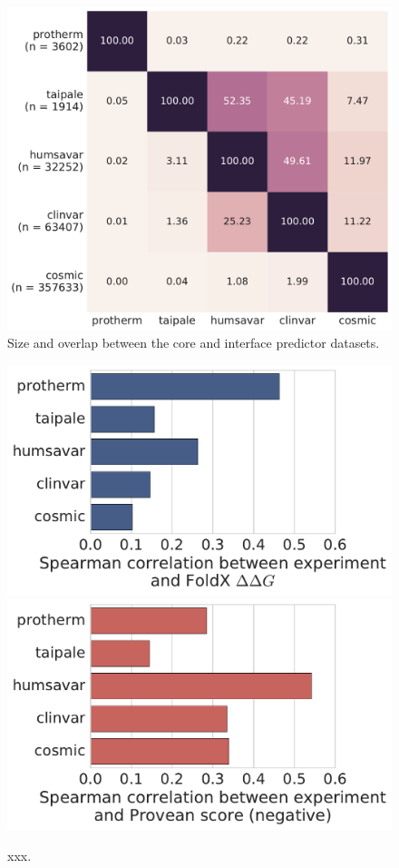 
\begin{figure}[h]
	\centering
	\includegraphics[width=1\textwidth]{figures/elaspic_training_set/core_data_statistics/training_set_overlap_final}
	\caption{Size and overlap between the core and interface predictor datasets.}
\end{figure}


\begin{figure}[h]
	\centering
	\includegraphics[width=1\textwidth]{figures/elaspic_training_set/core_data_statistics/foldx_correlation_final}
	\includegraphics[width=1\textwidth]{figures/elaspic_training_set/core_data_statistics/provean_correlation_final}
	\caption{xxx.}
\end{figure}
